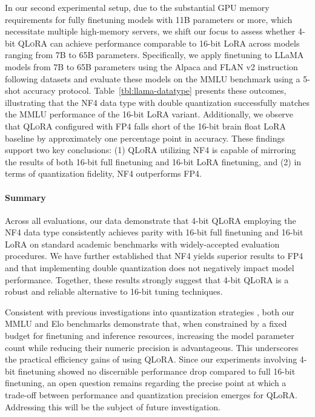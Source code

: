 In our second experimental setup, due to the substantial GPU memory requirements for fully finetuning models with 11B parameters or more, which necessitate multiple high-memory servers, we shift our focus to assess whether 4-bit \textsc{QLoRA} can achieve performance comparable to 16-bit LoRA across models ranging from 7B to 65B parameters. Specifically, we apply finetuning to LLaMA models from 7B to 65B parameters using the Alpaca and FLAN v2 instruction following datasets and evaluate these models on the MMLU benchmark using a 5-shot accuracy protocol. Table~\ref{tbl:llama-datatype} presents these outcomes, illustrating that the NF4 data type with double quantization successfully matches the MMLU performance of the 16-bit LoRA variant. Additionally, we observe that \textsc{QLoRA} configured with FP4 falls short of the 16-bit brain float LoRA baseline by approximately one percentage point in accuracy. These findings support two key conclusions: (1) \textsc{QLoRA} utilizing NF4 is capable of mirroring the results of both 16-bit full finetuning and 16-bit LoRA finetuning, and (2) in terms of quantization fidelity, NF4 outperforms FP4.

\paragraph{Summary} Across all evaluations, our data demonstrate that 4-bit \textsc{QLoRA} employing the NF4 data type consistently achieves parity with 16-bit full finetuning and 16-bit LoRA on standard academic benchmarks with widely-accepted evaluation procedures. We have further established that NF4 yields superior results to FP4 and that implementing double quantization does not negatively impact model performance. Together, these results strongly suggest that 4-bit \textsc{QLoRA} is a robust and reliable alternative to 16-bit tuning techniques.

Consistent with previous investigations into quantization strategies \citep{dettmers2022case}, both our MMLU and Elo benchmarks demonstrate that, when constrained by a fixed budget for finetuning and inference resources, increasing the model parameter count while reducing their numeric precision is advantageous. This underscores the practical efficiency gains of using \textsc{QLoRA}. Since our experiments involving 4-bit finetuning showed no discernible performance drop compared to full 16-bit finetuning, an open question remains regarding the precise point at which a trade-off between performance and quantization precision emerges for QLoRA. Addressing this will be the subject of future investigation.

